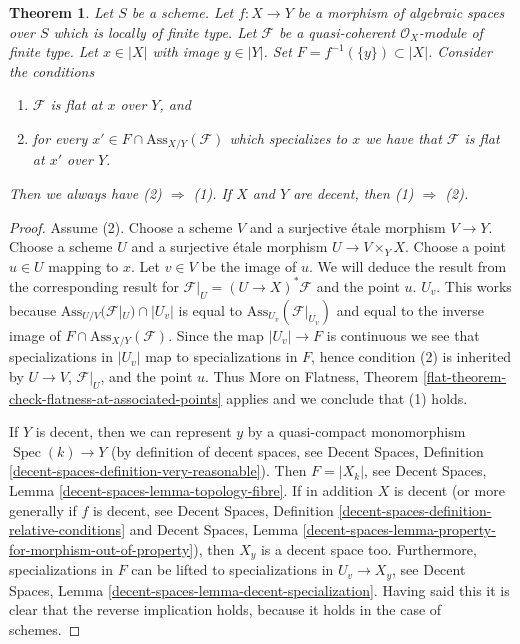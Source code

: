\documentclass{stacks-project}
\theoremstyle{plain}
\newtheorem{theorem}[subsection]{Theorem}
\theoremstyle{definition}
\theoremstyle{remark}
\numberwithin{equation}{subsection}
\def\Spec{\mathop{\mathrm{Spec}}}
\begin{document}
\begin{theorem}
\label{theorem-check-flatness-at-associated-points}
Let $S$ be a scheme.
Let $f : X \to Y$ be a morphism of algebraic spaces over $S$
which is locally of finite type.
Let $\mathcal{F}$ be a quasi-coherent $\mathcal{O}_X$-module of finite type.
Let $x \in |X|$ with image $y \in |Y|$.
Set $F = f^{-1}(\{y\}) \subset |X|$.
Consider the conditions
\begin{enumerate}
\item $\mathcal{F}$ is flat at $x$ over $Y$, and
\item for every $x' \in F \cap \text{Ass}_{X/Y}(\mathcal{F})$ which
specializes to $x$ we have that $\mathcal{F}$ is flat at $x'$ over $Y$.
\end{enumerate}
Then we always have (2) $\Rightarrow$ (1). If $X$ and $Y$ are
decent, then (1) $\Rightarrow$ (2).
\end{theorem}

\begin{proof}
Assume (2).
Choose a scheme $V$ and a surjective \'etale morphism $V \to Y$.
Choose a scheme $U$ and a surjective \'etale morphism $U \to V \times_Y X$.
Choose a point $u \in U$ mapping to $x$. Let $v \in V$ be the image of $u$.
We will deduce the result from the corresponding result for
$\mathcal{F}|_U = (U \to X)^*\mathcal{F}$ and the point $u$.
$U_v$. This works because $\text{Ass}_{U/V}(\mathcal{F}|_U) \cap |U_v|$
is equal to $\text{Ass}_{U_v}(\mathcal{F}|_{U_v})$ and equal to the inverse
image of $F \cap \text{Ass}_{X/Y}(\mathcal{F})$.
Since the map $|U_v| \to F$ is continuous we see that
specializations in $|U_v|$ map to specializations in $F$,
hence condition (2) is inherited by $U \to V$,
$\mathcal{F}|_U$, and the point $u$.
Thus More on Flatness, Theorem
\ref{flat-theorem-check-flatness-at-associated-points} applies
and we conclude that (1) holds.

\medskip\noindent
If $Y$ is decent, then we can represent
$y$ by a quasi-compact monomorphism $\Spec(k) \to Y$
(by definition of decent spaces, see
Decent Spaces, Definition \ref{decent-spaces-definition-very-reasonable}).
Then $F = |X_k|$, see
Decent Spaces, Lemma \ref{decent-spaces-lemma-topology-fibre}.
If in addition $X$ is decent (or more generally if $f$ is decent, see
Decent Spaces, Definition \ref{decent-spaces-definition-relative-conditions}
and Decent Spaces, Lemma
\ref{decent-spaces-lemma-property-for-morphism-out-of-property}),
then $X_y$ is a decent space too. Furthermore, specializations in
$F$ can be lifted to specializations
in $U_v \to X_y$, see
Decent Spaces, Lemma \ref{decent-spaces-lemma-decent-specialization}.
Having said this it is clear that the reverse implication
holds, because it holds in the case of schemes.
\end{proof}
\end{document}
